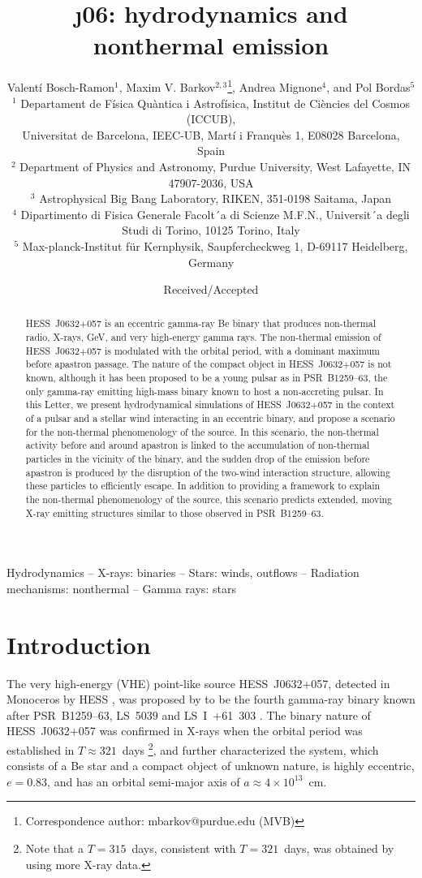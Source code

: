 \documentclass[usenatbib]{mn2e}
\title[\j06{}: hydrodynamics \& NT emission]{\j06{}: hydrodynamics and nonthermal emission}
\author[Bosch-Ramon et al.]{Valent\'i Bosch-Ramon$^1$,
Maxim V. Barkov$^{2,3}$\thanks{Correspondence author: mbarkov@purdue.edu (MVB)},
Andrea Mignone$^{4}$,
and Pol Bordas$^{5}$
 \\
$^{1}$ Departament de F\'{i}sica Qu\`antica i Astrof\'{i}sica, Institut de Ci\`encies del Cosmos (ICCUB),\\
Universitat de Barcelona, IEEC-UB, Mart\'{i} i Franqu\`es 1, E08028 Barcelona, Spain\\
$^{2}$ Department of Physics and Astronomy, Purdue University, West Lafayette, IN 47907-2036, USA\\
$^{3}$ Astrophysical Big Bang Laboratory, RIKEN, 351-0198 Saitama, Japan \\
$^{4}$ Dipartimento di Fisica Generale Facolt´a di Scienze M.F.N., Universit´a degli Studi di
Torino, 10125 Torino, Italy\\
$^{5}$ Max-planck-Institut f\"ur Kernphysik, Saupfercheckweg 1, D-69117 Heidelberg, Germany
}
\def\psr{{PSR~B1259--63}}
\def\ls{{LS~5039}}
\def\lsi{{LS~I~+61~303}}
\def\j06{{HESS~J0632$+$057}}
\begin{document}
\date{Received/Accepted}
\maketitle
                                                                                           
\begin{abstract} 
\j06 is an eccentric gamma-ray Be binary that produces non-thermal radio, X-rays{, GeV,} and very high-energy gamma rays. The non-thermal emission of \j06 is modulated with the orbital period, 
with a dominant maximum before apastron passage. The nature of the compact object in \j06 is not known, although it has been proposed to be a young pulsar as in \psr{}, 
the only gamma-ray emitting high-mass binary known to host a non-accreting pulsar. In this Letter, we present hydrodynamical simulations of \j06 in the context of 
a pulsar and a stellar wind interacting in an eccentric binary, and propose a scenario for the non-thermal phenomenology of the source. In this scenario, the non-thermal 
activity before and around apastron is linked to the accumulation of non-thermal particles in the vicinity of the binary, and the sudden drop of the emission before apastron 
is produced by the disruption of the two-wind interaction structure, allowing these particles to efficiently escape. In addition to providing a framework to explain the 
non-thermal phenomenology of the source, this scenario predicts extended, moving X-ray emitting structures similar to those observed in \psr{}.
\end{abstract}
                                                                                          
\begin{keywords}
Hydrodynamics -- X-rays: binaries -- Stars: winds, outflows -- Radiation mechanisms: nonthermal -- Gamma rays: stars
\end{keywords}
                                                                                          
\section{Introduction}
\label{intro}

The very high-energy (VHE) point-like source \j06, detected in Monoceros by HESS \citep{aha07}, was proposed by \cite{hin09} to be the fourth gamma-ray binary known after \psr{}, \ls{} and \lsi{} \citep{aha05,tav98,par00,aha05b,alb06}. The binary nature of \j06 was confirmed in X-rays when the orbital period was established in $T\approx 321$~days \citep{bon11}\footnote{Note that a $T=315$~days, consistent with $T=321$~days, was obtained by \cite{ali14} using more X-ray data.}, and \cite{cas12} further characterized the system, which consists of a Be star and a compact object of unknown nature, is highly eccentric, $e=0.83$, and has an orbital semi-major axis of $a\approx 4\times 10^{13}$~cm.
\end{document}

